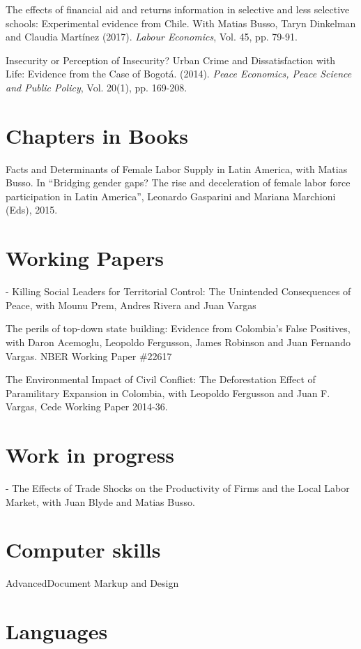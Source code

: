 \documentclass{moderncv}
\begin{document}
{The effects of financial aid and returns information in selective and less selective schools: Experimental evidence from Chile. With Matias Busso, Taryn Dinkelman and Claudia Martínez (2017). \emph{Labour Economics}, Vol. 45, pp. 79-91.\\}

{Insecurity or Perception of Insecurity? Urban Crime and Dissatisfaction with Life: Evidence from the Case of Bogot\'a. (2014). \emph{Peace Economics, Peace Science and Public Policy}, Vol. 20(1), pp. 169-208.}

\section{\textbf{Chapters in Books}}
{Facts and Determinants of Female Labor Supply in Latin America, with Matias Busso. In “Bridging gender gaps? The rise and deceleration of female labor force participation in Latin America”, Leonardo Gasparini and Mariana Marchioni (Eds), 2015.}

\section{\textbf{Working Papers}}
{- Killing Social Leaders for Territorial Control: The Unintended Consequences of Peace, with Mounu Prem, Andres Rivera and Juan Vargas\\}

{The perils of top-down state building: Evidence from Colombia’s False Positives, with Daron Acemoglu, Leopoldo Fergusson, James Robinson and Juan Fernando Vargas. NBER Working Paper \#22617\\  }

{The Environmental Impact of Civil Conflict: The Deforestation Effect of Paramilitary Expansion in Colombia, with Leopoldo Fergusson and Juan F. Vargas, Cede Working Paper 2014-36.}

\section{\textbf{Work in progress}}

{- The Effects of Trade Shocks on the Productivity of Firms and the Local Labor Market, with Juan Blyde and Matias Busso.\\}

\section{\textbf{Computer skills}}
 {Advanced}{Document Markup and Design}


\section{\textbf{Languages}}
\end{document}
